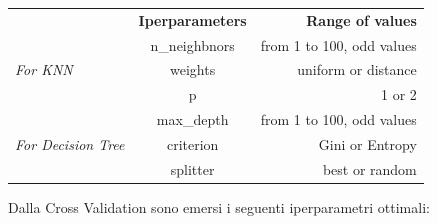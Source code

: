 \begin{table}[ht]
\centering
\begin{tabular}{@{}l|c|r|@{}}
\cmidrule(l){2-3}
                                            & \multicolumn{1}{l|}{\textbf{Iperparameters}} & \textbf{Range of values}  \\ \cmidrule(l){2-3} 
\multirow{3}{*}{\textit{For KNN}}           & n\_neighbnors                                & from 1 to 100, odd values \\ \cmidrule(l){2-3} 
                                            & weights                                      & uniform or distance       \\ \cmidrule(l){2-3} 
                                            & p                                            & 1 or 2                    \\ \cmidrule(l){2-3} 
\multirow{3}{*}{\textit{For Decision Tree}} & max\_depth                                   & from 1 to 100, odd values \\ \cmidrule(l){2-3} 
                                            & criterion                                    & Gini or Entropy           \\ \cmidrule(l){2-3} 
                                            & splitter                                     & best or random            \\ \cmidrule(l){2-3} 
\end{tabular}
\end{table}

\newline Dalla Cross Validation sono emersi i seguenti iperparametri ottimali:

